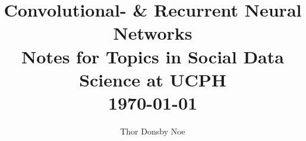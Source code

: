 \documentclass[12pt, a4paper]{article}
\begin{document}
\begin{spacing}{1.213}


\title{Convolutional- \& Recurrent Neural Networks \\
\large Notes for Topics in Social Data Science at UCPH \\
\normalsize \today
}
\author{\normalsize  Thor Donsby Noe }
\date{} %
\maketitle %
\setcounter{page}{1} %





\end{spacing}
\end{document}
